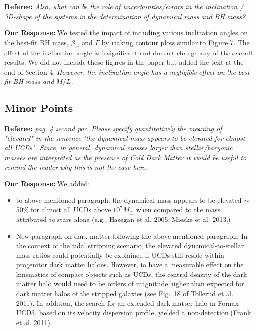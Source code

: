\documentclass[11pt]{article}
\begin{document}
\vspace{0.5cm}

{\bf Referee:}  {\it Also, what can be the role of uncertainties/errors in the inclination / 3D-shape of the systems in the determination of dynamical mass and BH mass?}

\vspace{0.2cm}
{\bf Our Response:} We tested the impact of including various inclination angles on the best-fit BH mass, $\beta_z$, and $\Gamma$ by making contour plots similar to Figure 7. The effect of the inclination angle is insignificant and doesn't change any of the overall results. We did not include these figures in the paper but added the text at the end of Section 4: \textit{However, the inclination angle has a negligible effect on the best-fit BH mass and $M/L$. }

\newpage





\noindent\makebox[\linewidth]{\rule{17cm}{1pt}}\vspace{-0.5cm}
\begin{center}
  \section{Minor Points}
\end{center}
\vspace{-0.5cm}
\noindent\makebox[\linewidth]{\rule{17cm}{1pt}}

\vspace{0.2cm}
{\bf Referee:} {\it pag. 4 second par. Please specify quantitatively the meaning of "elevated" in the sentence "the dynamical mass appears to be elevated for almost all UCDs". Since, in general, dynamical masses larger than stellar/baryonic masses are interpreted as the presence of Cold Dark Matter it would be useful to remind the reader why this is not the case here. }

\vspace{0.2cm}
{\bf Our Response:} We added:
\begin{itemize}
\item to above mentioned paragraph: the dynamical mass appears to be elevated $\sim$50\% for almost all UCDs above $10^7 M_{\odot}$ when compared to the mass attributed to stars alone (e.g., Hasegan et al. 2005; Mieske et al. 2013.)
\item New paragraph on dark matter following the above mentioned paragraph: In the context of the tidal stripping scenario, the elevated dynamical-to-stellar mass ratios could potentially be explained if UCDs still reside within progenitor dark matter haloes. However, to have a measurable effect on the kinematics of compact objects such as UCDs, the central density of the dark matter halo would need to be orders of magnitude higher than expected for dark matter halos of the stripped galaxies (see Fig.~18 of Tollerud et al. 2011). In addition, the search for an extended dark matter halo in Fornax UCD3, based on its velocity dispersion profile, yielded a non-detection (Frank et al. 2011).
\end{itemize}
\end{document}
